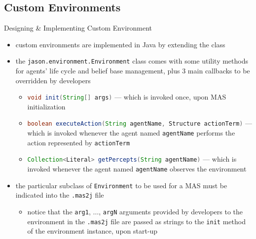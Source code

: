 \documentclass[presentation]{beamer}\mode<presentation>{\usetheme{AMSBolognaFC}}
\begin{document}
\subsection{Custom Environments}

\begin{frame}[c,allowframebreaks]{Designing \& Implementing Custom Environment}
    
    \begin{itemize}
        \item custom environments are implemented in Java by extending the class
        \begin{center}
        \end{center}
    
        \vspace{.3cm}
    
        \item the \texttt{jason.environment.\alert{Environment}} class comes with some utility methods for agents' life cycle and belief base management, plus 3 main \alert{callbacks} to be overridden by developers
        \begin{itemize}
            \item \lstinline[language=Java]{void init(String[] args)} --- which is invoked once, upon MAS initialization
            \item \lstinline[language=Java]{boolean executeAction(String agentName, Structure actionTerm)} --- which is invoked whenever the agent named \texttt{agentName} performs the action represented by \texttt{actionTerm}
            \item \lstinline[language=Java]{Collection<Literal> getPercepts(String agentName)} --- which is invoked whenever the agent named \texttt{agentName} observes the environment
        \end{itemize}
    
        \framebreak
        
        \item the particular subclass of \texttt{Environment} to be used for a MAS must be indicated into the \texttt{.mas2j} file
        
        \begin{itemize}
            \item notice that the \texttt{arg1}, $\ldots$, \texttt{argN} arguments provided by developers to the environment in the \texttt{.mas2j} file are passed \alert{as strings} to the \texttt{init} method of the environment instance, upon start-up
        \end{itemize}
        
    \end{itemize}
    
\end{frame} 
\end{document}
